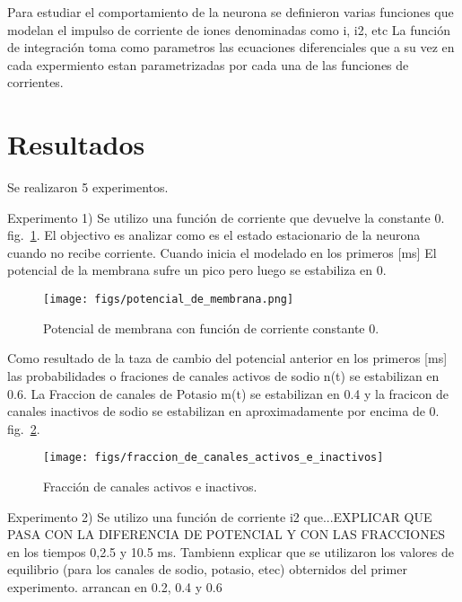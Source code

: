 \documentclass[aps,prl,twocolumn,groupedaddress]{revtex4-2}
\begin{document}
Para estudiar el comportamiento de la neurona se definieron varias funciones que modelan el impulso de corriente de iones
denominadas como i, i2, etc
La función de integración toma como parametros las ecuaciones diferenciales que a su vez en cada expermiento estan parametrizadas por cada una de las funciones de corrientes.
 

\section{Resultados}
Se realizaron 5 experimentos.

Experimento 1) Se utilizo una función de corriente que devuelve la constante 0. 
fig.~\ref{fig1}. El objectivo es analizar como es el estado estacionario de la neurona cuando no recibe corriente. Cuando inicia el modelado en los primeros [ms] El potencial de la membrana sufre un pico pero luego se estabiliza en 0. 

\begin{figure}[h!]
\centering
\texttt{[image: figs/potencial\_de\_membrana.png]}
\caption{Potencial de membrana con función de corriente constante 0. \label{fig1}}
\end{figure}


Como resultado de la taza de cambio del potencial anterior en los primeros [ms] las probabilidades o fraciones de canales activos de sodio n(t) se estabilizan en 0.6. La Fraccion de canales de Potasio m(t) se estabilizan en 0.4 y la fracicon de canales inactivos de sodio se estabilizan en aproximadamente por encima de 0. fig.~\ref{fig2}.











\begin{figure}[h!]
\centering
\texttt{[image: figs/fraccion\_de\_canales\_activos\_e\_inactivos]}
\caption{Fracción de canales activos e inactivos. \label{fig2}}
\end{figure}


Experimento 2) Se utilizo una función de corriente i2 que...EXPLICAR QUE PASA CON LA DIFERENCIA DE POTENCIAL Y CON LAS FRACCIONES en los tiempos 0,2.5 y 10.5 ms. 
Tambienn explicar que se utilizaron los valores de equilibrio (para los canales de sodio, potasio, etec) obternidos del primer experimento. arrancan en 0.2, 0.4 y 0.6
\end{document}
